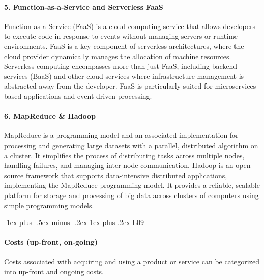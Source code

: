 \documentclass[10pt, landscape]{article}
\makeatletter
\renewcommand{\subsubsection}{\@startsection{subsubsection}{3}{0mm}%
  {-1ex plus -.5ex minus -.2ex}%
  {1ex plus .2ex}%
{\normalfont\small\bfseries}}%
\makeatother
\begin{document}
\begin{multicols*}{4}
\paragraph{5. Function-as-a-Service and Serverless
FaaS}\label{function-as-a-service-and-serverless-faas}

Function-as-a-Service (FaaS) is a cloud computing service that allows
developers to execute code in response to events without managing
servers or runtime environments. FaaS is a key component of serverless
architectures, where the cloud provider dynamically manages the
allocation of machine resources. Serverless computing encompasses more
than just FaaS, including backend services (BaaS) and other cloud
services where infrastructure management is abstracted away from the
developer. FaaS is particularly suited for microservices-based
applications and event-driven processing.

\paragraph{6. MapReduce \& Hadoop}\label{mapreduce-hadoop}

MapReduce is a programming model and an associated implementation for
processing and generating large datasets with a parallel, distributed
algorithm on a cluster. It simplifies the process of distributing tasks
across multiple nodes, handling failures, and managing inter-node
communication. Hadoop is an open-source framework that supports
data-intensive distributed applications, implementing the MapReduce
programming model. It provides a reliable, scalable platform for storage
and processing of big data across clusters of computers using simple
programming models.

\subsubsection{L09}\label{l09}

\paragraph{Costs (up-front, on-going)}\label{costs-up-front-on-going}

Costs associated with acquiring and using a product or service can be
categorized into up-front and ongoing costs.


\end{multicols*}
\end{document}
